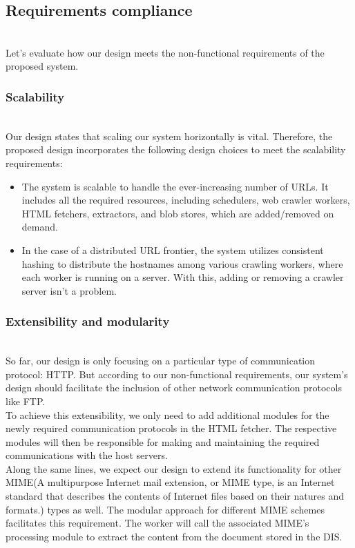 \subsection{Requirements compliance}\label{a2ibNrlpABbYpgGK1fvB_}
\\
Let's evaluate how our design meets the non-functional requirements of the proposed system.

\subsubsection{Scalability}\label{1E8Qv4BYYGBsKwOLqOjsL}
\\
Our design states that scaling our system horizontally is vital. Therefore, the proposed design incorporates the following design choices to meet the scalability requirements:

\begin{itemize}
\item
\protect{}\label{RpxrhVQxhsBiJ7IgDAA4w}
The system is scalable to handle the ever-increasing number of URLs. It includes all the required resources, including schedulers, web crawler workers, HTML fetchers, extractors, and blob stores, which are added/removed on demand.
\item
\protect{}\label{XHUAtwb0C3T4mpptmlZsR}
In the case of a distributed URL frontier, the system utilizes consistent hashing to distribute the hostnames among various crawling workers, where each worker is running on a server. With this, adding or removing a crawler server isn't a problem.
\end{itemize}

\subsubsection{Extensibility and modularity}\label{kEFWwib7KO7SFitlw9Pk3}
\\
So far, our design is only focusing on a particular type of communication protocol: HTTP. But according to our non-functional requirements, our system's design should facilitate the inclusion of other network communication protocols like FTP.
\\
To achieve this extensibility, we only need to add additional modules for the newly required communication protocols in the HTML fetcher. The respective modules will then be responsible for making and maintaining the required communications with the host servers.
\\
Along the same lines, we expect our design to extend its functionality for other MIME(A multipurpose Internet mail extension, or MIME type, is an Internet standard that describes the contents of Internet files based on their natures and formats.) types as well. The modular approach for different MIME schemes facilitates this requirement. The worker will call the associated MIME's processing module to extract the content from the document stored in the DIS.

